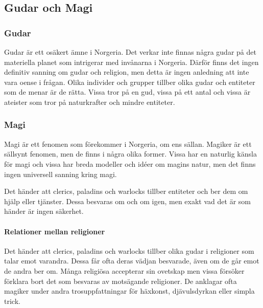 \subsection{Gudar och Magi}
\subsubsection{Gudar}
Gudar är ett osäkert ämne i Norgeria. Det verkar inte finnas några gudar på det materiella planet som intrigerar med invånarna i Norgeria. Därför finns det ingen definitiv sanning om gudar och religion, men detta är ingen anledning att inte vara oense i frågan. Olika individer och grupper tillber olika gudar och entiteter som de menar är de rätta. Vissa tror på en gud, vissa på ett antal och vissa är ateister som tror på naturkrafter och mindre entiteter. 

\subsubsection{Magi}
Magi är ett fenomen som förekommer i Norgeria, om ens sällan. Magiker är ett sällsynt fenomen, men de finns i några olika former. Vissa har en naturlig känsla för magi och vissa har breda modeller och idéer om magins natur, men det finns ingen universell sanning kring magi. 

Det händer att clerics, paladins och warlocks tillber entiteter och ber dem om hjälp eller tjänster. Dessa besvaras om och om igen, men exakt vad det är som händer är ingen säkerhet.

\paragraph{Relationer mellan religioner}
Det händer att clerics, paladins och warlocks tillber olika gudar i religioner som talar emot varandra. Dessa får ofta deras vädjan besvarade, även om de går emot de andra ber om. Många religiösa accepterar sin ovetskap men vissa försöker förklara bort det som besvaras av motsägande religioner. De anklagar ofta magiker under andra trosuppfattningar för häxkonst, djävulsdyrkan eller simpla trick.
